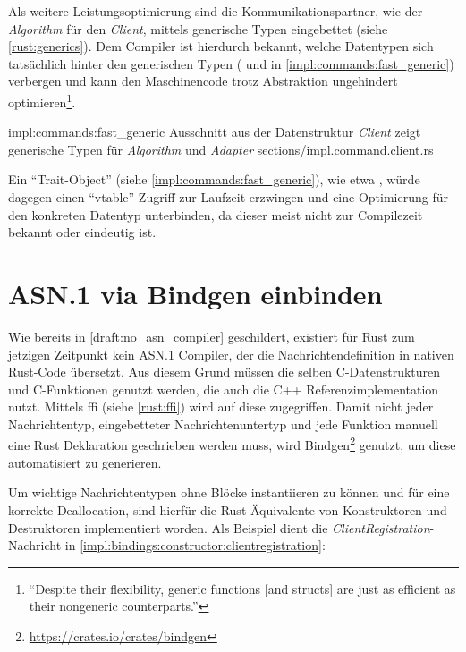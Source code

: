 Als weitere Leistungsoptimierung sind die Kommunikationspartner, wie der \textit{Algorithm} für den \textit{Client}, mittels generische Typen eingebettet (siehe \autoref{rust:generics}).
Dem Compiler ist hierdurch bekannt, welche Datentypen sich tatsächlich hinter den generischen Typen ( und  in \autoref{impl:commands:fast_generic}) verbergen und kann den Maschinencode trotz Abstraktion ungehindert optimieren\footnote{\enquote{Despite their flexibility, generic functions [and structs] are just as efficient as their nongeneric counterparts.}\cite[45]{rust:orly_programming}}.

\rustcinclude
	{impl:commands:fast_generic}
	{Ausschnitt aus der Datenstruktur \textit{Client} zeigt generische Typen für \textit{Algorithm} und \textit{Adapter}}
	{sections/impl.command.client.rs}
	
Ein \enquote{Trait-Object} (siehe \autoref{impl:commands:fast_generic}), wie etwa , würde dagegen einen \enquote{vtable} Zugriff zur Laufzeit erzwingen und eine Optimierung für den konkreten Datentyp unterbinden, da dieser meist nicht zur Compilezeit bekannt oder eindeutig ist.

\clearpage
\section{ASN.1 via Bindgen einbinden}
\label{impl:asn1_bindings}
\label{impl:issue:ffi}


Wie bereits in \autoref{draft:no_asn_compiler} geschildert, existiert für Rust zum jetzigen Zeitpunkt kein ASN.1 Compiler, der die Nachrichtendefinition in nativen Rust-Code übersetzt.
Aus diesem Grund müssen die selben C-Datenstrukturen und C-Funktionen genutzt werden, die auch die C++ Referenzimplementation nutzt.
Mittels \gls{ffi} (siehe \autoref{rust:ffi}) wird auf diese zugegriffen.
Damit nicht jeder Nachrichtentyp, eingebetteter Nachrichtenuntertyp und jede Funktion manuell eine Rust Deklaration geschrieben werden muss, wird Bindgen\footnote{\url{https://crates.io/crates/bindgen}} genutzt, um diese automatisiert zu generieren.

Um wichtige Nachrichtentypen ohne  Blöcke instantiieren zu können und für eine korrekte Deallocation, sind hierfür die Rust Äquivalente von Konstruktoren und Destruktoren implementiert worden.
Als Beispiel dient die \textit{ClientRegistration}-Nachricht in \autoref{impl:bindings:constructor:clientregistration}:


